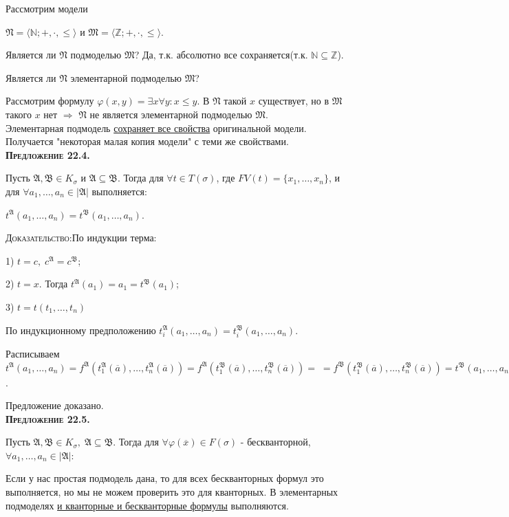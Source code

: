 \documentclass[18pt, a4paper]{extarticle}
\newcommand{\predl}[1]{\textbf{\textsc{Предложение #1}}}
\newcommand{\vp}{\varphi}
\newcommand{\vD}{\vDash}
\newcommand{\sg}{\sigma}
\newcommand{\ovl}[1]{\overline{#1}}
\newcommand{\centr}[1]{\makebox[\linewidth]{#1}}
\newcommand{\mA}{\mathfrak{A}}
\newcommand{\mB}{\mathfrak{B}}
\newcommand{\mR}{\mathfrak{N}}
\newcommand{\mM}{\mathfrak{M}}
\newcommand{\dok}{\textsc{Доказательство:}}
\begin{document}
Рассмотрим модели 

$\mR=\langle\mathbb N;+,\cdot,\leqslant\rangle$ и $\mM=\langle\mathbb Z;+,\cdot,\leqslant\rangle$.

Является ли $\mR$ подмоделью $\mM$? Да, т.к. абсолютно все сохраняется(т.к. $\mathbb N\subseteq\mathbb Z$).

Является ли $\mR$ элементарной подмоделью $\mM$? 

Рассмотрим формулу $\vp(x,y)=\exists x\forall y\!:x\leqslant y$. В $\mR$ такой $x$ существует, но в $\mM$ такого $x$ нет $\Rightarrow$ $\mR$ не является элементарной подмоделью $\mM$.\\

Элементарная подмодель \underline{сохраняет все свойства} оригинальной модели. Получается "некоторая малая копия модели"{} с теми же свойствами.\\

\predl {22.4.} 

Пусть $\mA,\mB\in K_\sg$ и $\mA\subseteq\mB$. Тогда для $\forall t\in T(\sg)$, где $FV(t)=\{x_1,\dots,x_n\}$, и для $\forall a_1,\dots,a_n\in|\mA|$ выполняется:

$t^\mA(a_1,\dots,a_n)=t^\mB(a_1,\dots,a_n)$.

\dok\;По индукции терма:

1) $t=c,\;c^\mA=c^\mB$;

2) $t=x$. Тогда $t^\mA(a_1)=a_1=t^\mB(a_1)$;

3) $t=t(t_1,\dots,t_n)$

По индукционному предположению $t_i^\mA(a_1,\dots,a_n)=t_i^\mB(a_1,\dots,a_n)$.

Расписываем $t^\mA(a_1,\dots,a_n)=f^\mA(t_1^\mA(\ovl a),\dots,t_n^\mA(\ovl a))=f^\mA(t_1^\mB(\ovl a),\dots,t_n^\mB(\ovl a))=\; =f^\mB(t_1^\mB(\ovl a),\dots,t_n^\mB(\ovl a))=t^\mB(a_1,\dots,a_n)$.

Предложение доказано.\\

\predl {22.5.} 

Пусть $\mA,\mB\in K_\sg,\;\mA\subseteq\mB$. Тогда для $\forall\vp(\ovl x)\in F(\sg)$ - бескванторной, $\forall a_1,\dots,a_n\in|\mA|\!:$\\
\centr{$\mA\vD\vp(a_1,\dots,a_n)\Leftrightarrow\mB\vD\vp(a_1,\dots,a_n)$.}

Если у нас простая подмодель дана, то для всех бескванторных формул это выполняется, но мы не можем проверить это для кванторных. В элементарных подмоделях \underline{и кванторные и бескванторные формулы} выполняются. 
\end{document}
